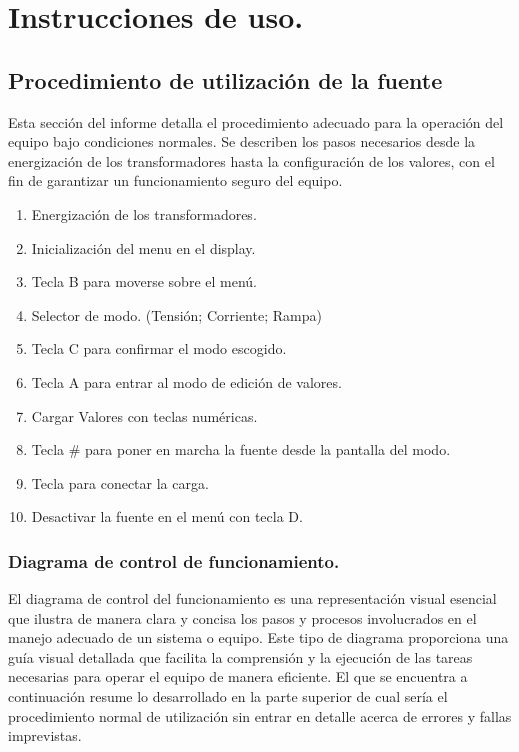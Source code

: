 \chapter{Instrucciones de uso.}

\label{C:Forma de operar la fuente DC}

\section{Procedimiento de utilización de la fuente}

Esta sección del informe detalla el procedimiento adecuado para la operación del equipo bajo condiciones normales. Se describen los pasos necesarios desde la energización de los transformadores hasta la configuración de los valores, con el fin de garantizar un funcionamiento seguro del equipo.\par 

\begin{enumerate}
    \item Energización de los transformadores.
    \item Inicialización del menu en el display.
    \item Tecla B para moverse sobre el menú.
    \item Selector de modo. (Tensión; Corriente; Rampa)
    \item Tecla C para confirmar el modo escogido.
    \item Tecla A para entrar al modo de edición de valores.
    \item Cargar Valores con teclas numéricas.
    \item Tecla \# para poner en marcha la fuente desde la pantalla del modo.
    \item Tecla \* para conectar la carga.
    \item Desactivar la fuente en el menú con tecla D.
\end{enumerate}

\subsection{Diagrama de control de funcionamiento.}

El diagrama de control del funcionamiento es una representación visual esencial que ilustra de manera clara y concisa los pasos y procesos involucrados en el manejo adecuado de un sistema o equipo. Este tipo de diagrama proporciona una guía visual detallada que facilita la comprensión y la ejecución de las tareas necesarias para operar el equipo de manera eficiente. El que se encuentra a continuación resume lo desarrollado en la parte superior de cual sería el procedimiento normal de utilización sin entrar en detalle acerca de errores y fallas imprevistas. 

